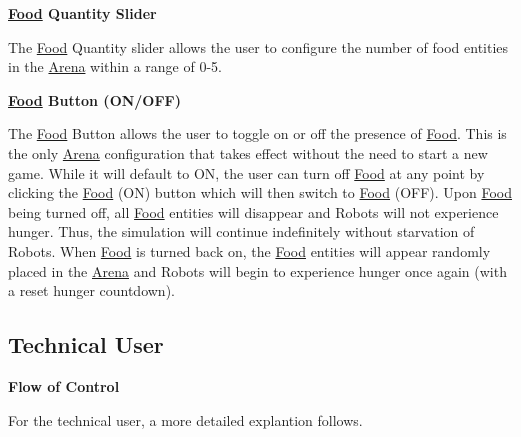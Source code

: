 {\bfseries \hyperlink{classFood}{Food} Quantity Slider}

The \hyperlink{classFood}{Food} Quantity slider allows the user to configure the number of food entities in the \hyperlink{classArena}{Arena} within a range of 0-\/5.

{\bfseries \hyperlink{classFood}{Food} Button (O\+N/\+O\+FF)}

The \hyperlink{classFood}{Food} Button allows the user to toggle on or off the presence of \hyperlink{classFood}{Food}. This is the only \hyperlink{classArena}{Arena} configuration that takes effect without the need to start a new game. While it will default to ON, the user can turn off \hyperlink{classFood}{Food} at any point by clicking the \hyperlink{classFood}{Food} (ON) button which will then switch to \hyperlink{classFood}{Food} (O\+FF). Upon \hyperlink{classFood}{Food} being turned off, all \hyperlink{classFood}{Food} entities will disappear and Robots will not experience hunger. Thus, the simulation will continue indefinitely without starvation of Robots. When \hyperlink{classFood}{Food} is turned back on, the \hyperlink{classFood}{Food} entities will appear randomly placed in the \hyperlink{classArena}{Arena} and Robots will begin to experience hunger once again (with a reset hunger countdown).\hypertarget{index_technical}{}\subsection{Technical User}\label{index_technical}
{\bfseries Flow of Control}

For the technical user, a more detailed explantion follows.

